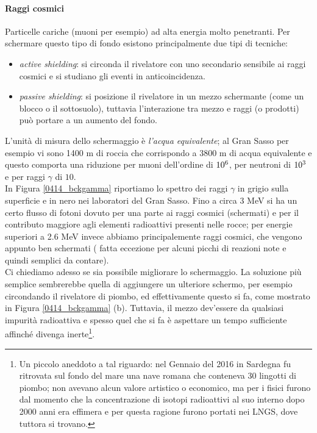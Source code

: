 \paragraph{Raggi cosmici}
Particelle cariche (muoni per esempio) ad alta energia molto penetranti. Per schermare questo tipo di fondo esistono principalmente due tipi di tecniche:
\begin{itemize}
	\item \textit{active shielding}: si circonda il rivelatore con uno secondario sensibile ai raggi cosmici e si studiano gli eventi in anticoincidenza.
	\item \textit{passive shielding}: si posizione il rivelatore in un mezzo schermante (come un blocco o il sottosuolo), tuttavia l'interazione tra mezzo e raggi (o prodotti) può portare a un aumento del fondo.
\end{itemize}
L'unità di misura dello schermaggio è \textit{l'acqua equivalente}; al Gran Sasso per esempio vi sono 1400 m di roccia che corrispondo a 3800 m di acqua equivalente e questo comporta una riduzione per muoni dell'ordine di $10^{6}$, per neutroni di $10^{3}$ e per raggi $\gamma$ di $10$.\\
In Figura \ref{0414_bckgamma} riportiamo lo spettro dei raggi $\gamma$ in grigio sulla superficie e in nero nei laboratori del Gran Sasso.
Fino a circa 3 MeV si ha un certo flusso di fotoni dovuto per una  parte ai raggi cosmici (schermati) e per il contributo maggiore agli elementi radioattivi presenti nelle rocce; per energie superiori a 2.6 MeV invece abbiamo principalemente raggi cosmici, che vengono appunto ben schermati ( fatta eccezione per alcuni picchi di reazioni note e quindi semplici da contare).\\
Ci chiediamo adesso se sia possibile migliorare lo schermaggio. La soluzione più semplice sembrerebbe quella di aggiungere un ulteriore schermo, per esempio circondando il rivelatore di piombo, ed effettivamente questo si fa, come mostrato in Figura \ref{0414_bckgamma} (b). Tuttavia, il mezzo dev'essere  da qualsiasi impurità radioattiva e spesso quel che si fa è aspettare un tempo sufficiente affinché divenga inerte\footnote{Un piccolo aneddoto a tal riguardo: nel Gennaio del 2016 in Sardegna fu ritrovata sul fondo del mare una nave romana che conteneva 30 lingotti di piombo; non avevano alcun valore artistico o economico, ma per i fisici furono  dal momento che la concentrazione di isotopi radioattivi al suo interno dopo 2000 anni era effimera e per questa ragione furono portati nei LNGS, dove tuttora si trovano.}.


